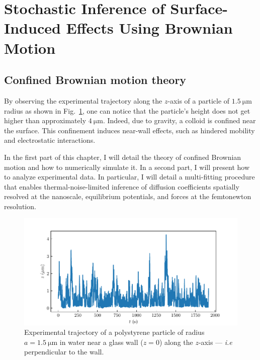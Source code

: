 \section{Stochastic Inference of Surface-Induced Effects Using Brownian Motion}
\label{chap3}

\subsection{Confined Brownian motion theory}
\label{sec:confined}
By observing the experimental trajectory along the $z$-axis of a particle of $1.5 ~ \mathrm{\mu m} $ radius as shown in Fig.~\ref{Fig:exp_z_traj}, one can notice that the particle's height does not get higher than approximately $4 ~ \mathrm{\mu m}$. Indeed, due to gravity, a colloid is confined near the surface. This confinement induces near-wall effects, such as hindered mobility and electrostatic interactions. 

In the first part of this chapter, I will detail the theory of confined Brownian motion and how to numerically simulate it. In a second part, I will present how to analyze experimental data. In particular, I will detail a multi-fitting procedure that enables thermal-noise-limited inference of diffusion coefficients spatially resolved at the nanoscale, equilibrium potentials, and forces at the femtonewton resolution.

\begin{figure}[ht]
	\centering
	\includegraphics{02_body/chapter3/images/traj_z/traj_z.pdf}
	\caption{Experimental trajectory of a polystyrene particle of radius $a = 1.5 ~ \mathrm{\mu m}$ in water near a glass wall ($z = 0$) along the $z$-axis --- \textit{i.e} perpendicular to the wall. \href{https://github.com/eXpensia/Confined-Brownian-Motion/blob/main/02_body/chapter3/images/traj_z/graph_ploting.ipynb}{\faGithub}}
	\label{Fig:exp_z_traj}
\end{figure}

